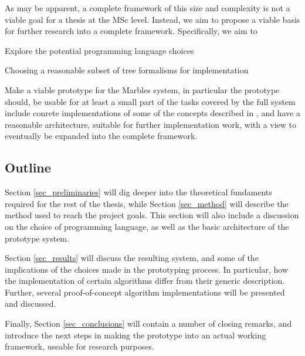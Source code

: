 As may be apparent, a complete framework of this size and complexity is not
a viable goal for a thesis at the MSc level. Instead, we aim to propose a
viable basis for further research into a complete framework. Specifically,
we aim to
\begin{compactitem}
\item Explore the potential programming language choices
\item Choosing a reasonable subset of tree formalisms for implementation
\item Make a viable prototype for the Marbles system, in particular the
prototype should,
\subitem be usable for at least a small part of the tasks covered by the
full system
\subitem include conrete implementations of some of the concepts described in
\cite{drewes_marbles}, and
\subitem have a reasonable architecture, suitable for further
implementation work, with a view to eventually be expanded into the
complete framework.
\end{compactitem}


\subsection{Outline}

Section \ref{sec_preliminaries} will dig deeper into the theoretical
fundaments required for the rest of the thesis, while Section
\ref{sec_method} will describe the method used to reach the project goals.
This section will also include a discussion on the choice of programming
language, as well as the basic architecture of the prototype system.

Section \ref{sec_results} will discuss the resulting system, and some of
the implications of the choices made in the prototyping process. In
particular, how the implementation of certain algorithms differ from their
generic description. Further, several proof-of-concept algorithm
implementations will be presented and discussed.

Finally, Section \ref{sec_conclusions} will contain a number of closing
remarks, and introduce the next steps in making the prototype into an
actual working framework, useable for research purposes.





